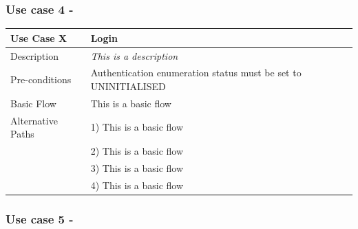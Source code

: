 \documentclass[12pt]{article}
\begin{document}
\begin{subappendices}
	\subsubsection{Use case 4 - }
	
	\begin{table}[H]
		\begin{tabular}{ll}
			\hline
			\rowcolor[HTML]{EFEFEF} 
			\textbf{Use Case X}  & \textbf{Login}                                                 \\ \hline
			\rowcolor[HTML]{F5FBFF} 
			Description 		 & \textit{This is a description}                                 \\ \hline
			\rowcolor[HTML]{EFEFEF} 
			Pre-conditions       & Authentication enumeration status must be set to UNINITIALISED \\ \hline
			\rowcolor[HTML]{F5FBFF} 
			Basic Flow           & This is a basic flow                                           \\ \hline
			\rowcolor[HTML]{EFEFEF} 
			Alternative Paths    & 1) This is a basic flow                                        \\
			\rowcolor[HTML]{EFEFEF} 
			& 2) This is a basic flow                                        \\
			\rowcolor[HTML]{EFEFEF} 
			& 3) This is a basic flow                                        \\
			\rowcolor[HTML]{EFEFEF} 
			& 4) This is a basic flow                                       
		\end{tabular}
	\end{table}

	\subsubsection{Use case 5 - }
	

\end{subappendices}
\end{document}
